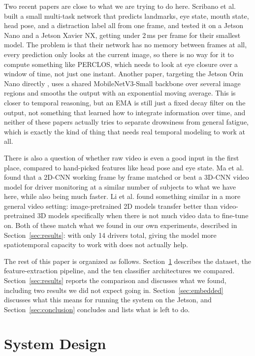 \documentclass[conference]{IEEEtran}
\begin{document}
Two recent papers are close to what we are trying to do here. Scribano et al. \cite{b_scribano} built a small multi-task network that predicts landmarks, eye state, mouth state, head pose, and a distraction label all from one frame, and tested it on a Jetson Nano and a Jetson Xavier NX, getting under 2\,ms per frame for their smallest model. The problem is that their network has no memory between frames at all, every prediction only looks at the current image, so there is no way for it to compute something like PERCLOS, which needs to look at eye closure over a window of time, not just one instant. Another paper, targeting the Jetson Orin Nano directly \cite{b_multiregion}, uses a shared MobileNetV3-Small backbone over several image regions and smooths the output with an exponential moving average. This is closer to temporal reasoning, but an EMA is still just a fixed decay filter on the output, not something that learned how to integrate information over time, and neither of these papers actually tries to separate drowsiness from general fatigue, which is exactly the kind of thing that needs real temporal modeling to work at all.

There is also a question of whether raw video is even a good input in the first place, compared to hand-picked features like head pose and eye state. Ma et al. \cite{b_ma2022} found that a 2D-CNN working frame by frame matched or beat a 3D-CNN video model for driver monitoring at a similar number of subjects to what we have here, while also being much faster. Li et al. \cite{b_imagepretrain} found something similar in a more general video setting: image-pretrained 2D models transfer better than video-pretrained 3D models specifically when there is not much video data to fine-tune on. Both of these match what we found in our own experiments, described in Section~\ref{sec:results}: with only 14 drivers total, giving the model more spatiotemporal capacity to work with does not actually help.

The rest of this paper is organized as follows. Section~\ref{sec:design} describes the dataset, the feature-extraction pipeline, and the ten classifier architectures we compared. Section~\ref{sec:results} reports the comparison and discusses what we found, including two results we did not expect going in. Section~\ref{sec:embedded} discusses what this means for running the system on the Jetson, and Section~\ref{sec:conclusion} concludes and lists what is left to do.

\section{System Design}
\label{sec:design}
\end{document}
